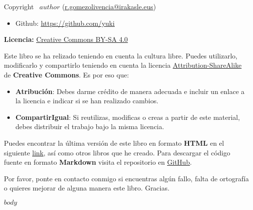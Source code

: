 \documentclass[11pt,titlepage,twoside,openany]{book}
\makeatletter
\let\oldhref\href
\renewcommand{\href}[2]{\oldhref{#1}{\uline{#2}}}
\renewcommand\tableofcontents{
  \begingroup
    \hypersetup{hidelinks} %
    \pagestyle{toc}
    \setcounter{tocdepth}{2}    %
    \setcounter{secnumdepth}{4} %
    \setlength{\parskip}{0em}
    \@starttoc{toc}
    \setlength{\parskip}{1.2em}
  \endgroup
  \thispagestyle{toc} %
  \clearpage
}
\newenvironment{custombox}[4]{
  \begin{tcolorbox}[
      colframe=#1, colbacktitle=#1,
      colupper=#1, colback=#2,
      enhanced, sidebyside, segmentation hidden,
      lefthand width=1.2cm,
      title=\textbf{#3},]
    \centering
    \color{#1}
    \fontsize{30pt}{-10pt}#4
    \tcblower
    \color{#1}
}{
  \end{tcolorbox}
}
\def\infoname{Informazioa}
\def\infoname{Información}
\newenvironment{infobox}{
  \begin{custombox}{cyan!60!black}{cyan!5!white}{\infoname}{\faCircleInfo}
}{
  \end{custombox}
}
\makeatother
\begin{document}
\restoregeometry
\clearpage %

\thispagestyle{empty}

\null
\vfill
\begin{flushleft}
    

    Copyright \textcopyright \ $author$ \hspace{1pt} (\href{mailto:r.gomezolivencia@irakasle.eus}{r.gomezolivencia@irakasle.eus})
    \begin{itemize}
        \item Github: \href{https://github.com/yuki}{https://github.com/yuki}
    \end{itemize}


    \vspace{5mm}
    \textbf{Licencia: } \href{https://creativecommons.org/licenses/by-sa/4.0/deed.es}{Creative Commons BY-SA 4.0}


    Este libro se ha relizado teniendo en cuenta la cultura libre. Puedes utilizarlo, modificarlo y compartirlo teniendo en cuenta la licencia \href{https://creativecommons.org/licenses/by-sa/4.0/}{Attribution-ShareAlike} de \textbf{Creative Commons}. Es por eso que:

    \begin{itemize}
        \item \textbf{Atribución}: Debes darme crédito de manera adecuada e incluir un enlace a la licencia e indicar si se han realizado cambios.
        \item \textbf{CompartirIgual}: Si reutilizas, modificas o creas a partir de este material, debes distribuir el trabajo bajo la misma licencia.
    \end{itemize}


    Puedes encontrar la última versión de este libro en formato \textbf{HTML} en el siguiente \href{https://yuki.github.io/my-books/}{link}, así como otros libros que he creado. Para descargar el código fuente en formato \textbf{Markdown} visita el repositorio en \href{https://github.com/yuki/my-books}{GitHub}.

    \begin{infobox}
        Por favor, ponte en contacto conmigo si encuentras algún fallo, falta de ortografía o quieres mejorar de alguna manera este libro. Gracias.
    \end{infobox}
    \vspace{5mm}
\end{flushleft}

\clearpage %


\makeatletter
  \renewcommand\@dotsep{200}
\makeatother

\tableofcontents


$body$
\end{document}
